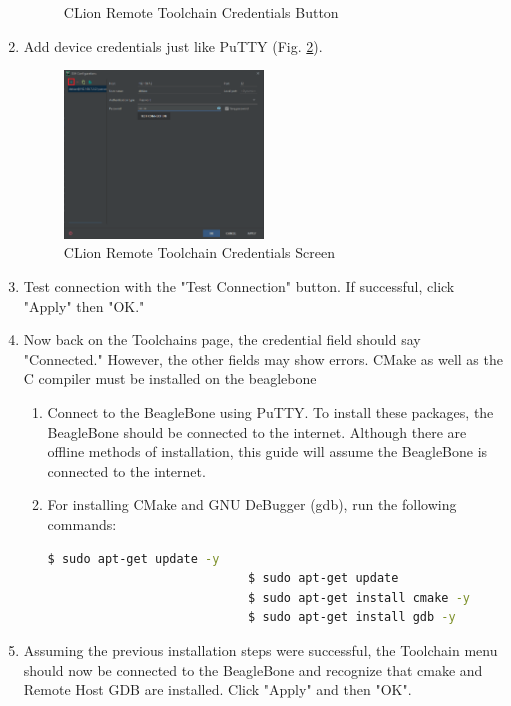 \begin{enumerate}
\begin{figure}[H]
                    \caption{CLion Remote Toolchain Credentials Button}
                    \label{fig:CLionToolChainCredentialsButton}
                \end{figure}
                \item Add device credentials just like PuTTY (Fig. \ref{fig:CLionToolChainCredentialsScreen}).
                \begin{figure}[H]
                    \centering
                    \includegraphics[width=0.5\textwidth]{images/beagleboneblack_truckcape_v4_images/ClionToolChainCredentialsScreen.png}
                    \caption{CLion Remote Toolchain Credentials Screen}
                    \label{fig:CLionToolChainCredentialsScreen}
                \end{figure}
                \item Test connection with the "Test Connection" button. If successful, click "Apply" then "OK."
                \item Now back on the Toolchains page, the credential field should say "Connected." However, the other fields may show errors. CMake as well as the C compiler must be installed on the beaglebone
                \begin{enumerate}
                    \item Connect to the BeagleBone using PuTTY. To install these packages, the BeagleBone should be connected to the internet. Although there are offline methods of installation, this guide will assume the BeagleBone is connected to the internet.
                    \item For installing CMake and GNU DeBugger (gdb), run the following commands:
                        \begin{lstlisting}[language=bash, autogobble=true]
                            $ sudo apt-get update -y
                            $ sudo apt-get update
                            $ sudo apt-get install cmake -y
                            $ sudo apt-get install gdb -y
                        \end{lstlisting}
                    \end{enumerate}
                \item Assuming the previous installation steps were successful, the Toolchain menu should now be connected to the BeagleBone and recognize that cmake and Remote Host GDB are installed. Click "Apply" and then "OK".
            \end{enumerate}
